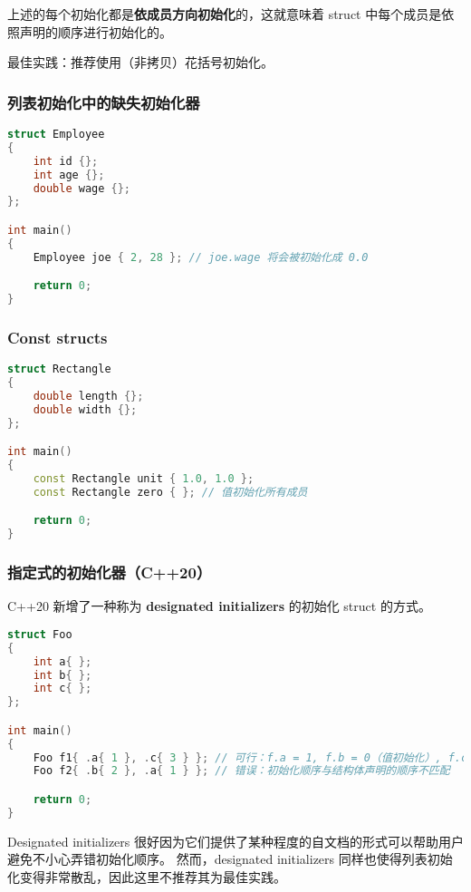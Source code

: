 \documentclass[../../LearnCpp.tex]{subfiles}
\begin{document}
上述的每个初始化都是\textbf{依成员方向初始化}的，这就意味着 struct 中每个成员是依照声明的顺序进行初始化的。

最佳实践：推荐使用（非拷贝）花括号初始化。

\subsubsection*{列表初始化中的缺失初始化器}

\begin{lstlisting}[language=C++]
struct Employee
{
    int id {};
    int age {};
    double wage {};
};

int main()
{
    Employee joe { 2, 28 }; // joe.wage 将会被初始化成 0.0

    return 0;
}
\end{lstlisting}

\subsubsection*{Const structs}

\begin{lstlisting}[language=C++]
struct Rectangle
{
    double length {};
    double width {};
};

int main()
{
    const Rectangle unit { 1.0, 1.0 };
    const Rectangle zero { }; // 值初始化所有成员

    return 0;
}
\end{lstlisting}

\subsubsection*{指定式的初始化器（C++20）}

C++20 新增了一种称为 \textbf{designated initializers} 的初始化 struct 的方式。

\begin{lstlisting}[language=C++]
struct Foo
{
    int a{ };
    int b{ };
    int c{ };
};

int main()
{
    Foo f1{ .a{ 1 }, .c{ 3 } }; // 可行：f.a = 1, f.b = 0（值初始化）, f.c = 3
    Foo f2{ .b{ 2 }, .a{ 1 } }; // 错误：初始化顺序与结构体声明的顺序不匹配

    return 0;
}
\end{lstlisting}

Designated initializers 很好因为它们提供了某种程度的自文档的形式可以帮助用户避免不小心弄错初始化顺序。
然而，designated initializers 同样也使得列表初始化变得非常散乱，因此这里不推荐其为最佳实践。
\end{document}
